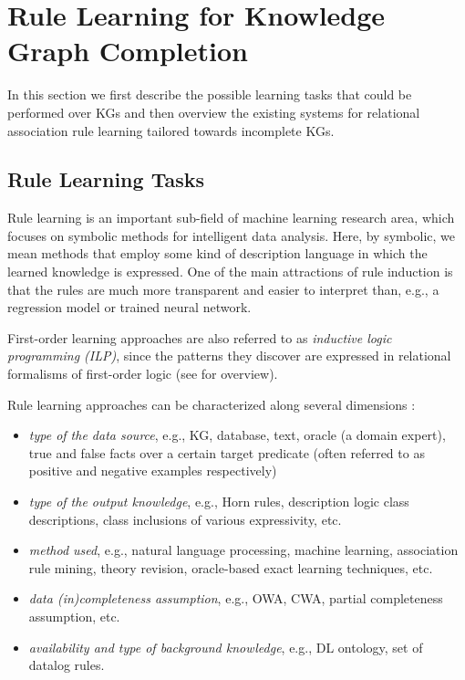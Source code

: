 \section{ Rule Learning for Knowledge Graph Completion}
\label{sec:rules_kg_completion}
In this section we first describe the possible learning tasks that could be performed over KGs and then overview the existing systems for relational association rule learning tailored towards incomplete KGs. 
\subsection{Rule Learning Tasks}
\label{sec:rules_learning_tasks}
Rule learning is an important sub-field of machine learning research area, which focuses on symbolic methods for intelligent data analysis. Here, by symbolic, we mean methods that employ some kind of description language in which the learned knowledge is expressed. One of the main attractions of rule induction is that the rules are much more transparent and easier to interpret than, e.g., a regression model or trained neural network.

First-order learning approaches are also referred to as %
 \emph{inductive logic programming (ILP)}, since the patterns they discover are expressed in
relational formalisms of first-order logic (see \cite{DBLP:books/daglib/0021868} for overview).

Rule learning approaches can be characterized along several dimensions \cite{DBLP:conf/semweb/SazonauS17}: 
\begin{itemize}
\item \emph{type of the data source}, e.g., KG, database, text, oracle (a domain expert), true and false facts over a certain target predicate (often referred to as positive and negative examples respectively)
\item \emph{type of the output knowledge}, e.g., Horn rules, description logic class descriptions, class inclusions of various expressivity, etc.
\item \emph{method used}, e.g., natural language processing, machine learning, association rule mining, theory revision, oracle-based exact learning techniques, etc.
\item \emph{data (in)completeness assumption}, e.g., OWA, CWA, partial completeness assumption, etc.
\item \emph{availability and type of background knowledge}, e.g., DL ontology, set of datalog rules.
\end{itemize}

